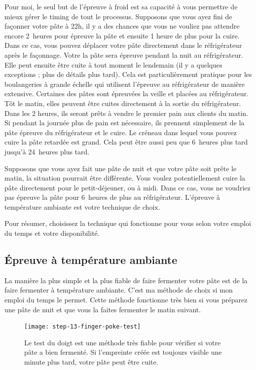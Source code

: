 Pour moi, le seul but de l'épreuve à froid est sa capacité à vous permettre
de mieux gérer le timing de tout le processus. Supposons que vous ayez fini de façonner
votre pâte à 22h, il y a des chances que vous ne vouliez pas attendre encore
2~heures pour épreuve la pâte et ensuite 1 heure de plus pour la cuire. Dans ce cas,
vous pouvez déplacer votre pâte directement dans le réfrigérateur après le façonnage. Votre
la pâte sera épreuve pendant la nuit au réfrigérateur. Elle peut ensuite être cuite à tout moment
le lendemain (il y a quelques exceptions ; plus de détails plus tard).
Cela est particulièrement pratique pour les boulangeries à grande échelle qui utilisent l'épreuve au réfrigérateur
de manière extensive. Certaines des pâtes sont épreuvées la veille et placées au réfrigérateur.
Tôt le matin, elles peuvent être cuites directement à la sortie du réfrigérateur. Dans les 2
heures, ils seront prêts à vendre le premier pain aux clients du matin. Si
pendant la journée plus de pain est nécessaire, ils prennent simplement de la pâte épreuve
du réfrigérateur et le cuire. Le créneau dans lequel vous pouvez cuire la pâte retardée
est grand. Cela peut être aussi peu que 6~heures plus tard jusqu'à 24~heures plus tard.

Supposons que vous ayez fait une pâte de nuit et que votre pâte soit prête le matin,
la situation pourrait être différente. Vous voulez potentiellement cuire la pâte directement
pour le petit-déjeuner, ou à midi. Dans ce cas, vous ne voudriez pas épreuve la pâte pour
6~heures de plus au réfrigérateur. L'épreuve à température ambiante est votre technique
de choix.

Pour résumer, choisissez la technique qui fonctionne pour vous selon votre
emploi du temps et votre disponibilité.

\subsection{Épreuve à température ambiante}La manière la plus simple et la plus fiable de faire fermenter votre pâte est de la faire fermenter à
température ambiante. C'est ma méthode de choix si mon emploi du temps le permet. Cette méthode
fonctionne très bien si vous préparez une pâte de nuit et que vous la faites fermenter le matin
suivant.

\begin{figure}[htb!]
  \texttt{[image: step-13-finger-poke-test]}
  \caption[Le test du doigt]{Le test du doigt est une méthode très fiable
      pour vérifier si votre pâte a bien fermenté. Si l'empreinte créée
      est toujours visible une minute plus tard, votre pâte peut être cuite.}%
  \label{fig:shaping-finger-poke}
\end{figure}

